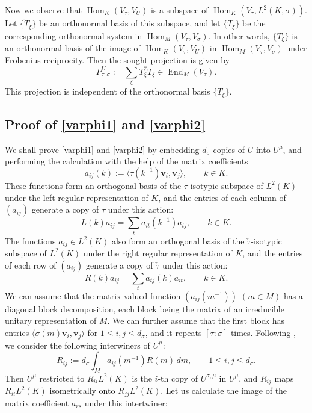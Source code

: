 \documentclass[11pt,oneside]{amsart}
\numberwithin{equation}{section}
\theoremstyle{remark}
\theoremstyle{plain}
\DeclareMathOperator{\Hom}{Hom}
\DeclareMathOperator{\End}{End}
\newcommand{\bv}{\mathbf{v}}
\renewcommand\leq{\leqslant}
\begin{document}
Now we observe that $\Hom_K(V_\tau,V_U)$ is a subspace of $\Hom_K(V_\tau,L^2(K,\sigma))$. Let $\{\widetilde T_\xi\}$ be an orthonormal basis of this subspace, and let $\{T_\xi\}$ be the corresponding orthonormal system in $\Hom_M(V_\tau,V_\sigma)$. In other words, $\{T_\xi\}$ is an orthonormal basis of the image of $\Hom_K(V_\tau,V_U)$ in $\Hom_M(V_\tau,V_\sigma)$ under Frobenius reciprocity. Then the sought projection is given by
\begin{equation}\label{varphi2}
P_{\tau,\sigma}^U:=\sum_\xi T_\xi^* T_\xi\in\End_M(V_\tau).
\end{equation}
This projection is independent of the orthonormal basis $\{T_\xi\}$.

\subsection{Proof of \eqref{varphi1} and \eqref{varphi2}}
We shall prove \eqref{varphi1} and \eqref{varphi2} by embedding $d_\sigma$ copies of $U$ into $U^\mu$, and performing the calculation with the help of the matrix coefficients
\[a_{ij}(k):=\langle\tau(k^{-1})\bv_i,\bv_j\rangle,\qquad k\in K.\]
These functions form an orthogonal basis of the $\tau$-isotypic subspace of $L^2(K)$ under the left regular representation of $K$, and the entries of each column of $(a_{ij})$ generate a copy of $\tau$ under this action:
\begin{equation*}
L(k)a_{ij}=\sum_t a_{it}(k^{-1})a_{tj},\qquad k\in K.
\end{equation*}
The functions $a_{ij}\in L^2(K)$ also form an orthogonal basis of the $\check\tau$-isotypic subspace of $L^2(K)$ under the right regular representation of $K$, and the entries of each row of $(a_{ij})$ generate a copy of $\check\tau$ under this action:
\begin{equation*}
R(k)a_{ij}=\sum_t a_{tj}(k)a_{it},\qquad k\in K.
\end{equation*}
We can assume that the matrix-valued function $(a_{ij}(m^{-1}))$ $(m\in M)$ has a diagonal block decomposition, each block being the matrix of an irreducible unitary representation of $M$. We can further assume that the first block has entries $\langle\sigma(m)\bv_i,\bv_j\rangle$ for $1\leq i,j\leq d_\sigma$, and it repeats $[\tau:\sigma]$ times. Following \cite[p.~447]{W1}, we consider the following interwiners of $U^\mu$:
\[R_{ij}:=d_\sigma\int_M a_{ij}(m^{-1})R(m)\,dm,\qquad 1\leq i,j\leq d_\sigma.\]
Then $U^\mu$ restricted to $R_{ii}L^2(K)$ is the $i$-th copy of $U^{\sigma,\mu}$ in $U^\mu$, and $R_{ij}$ maps $R_{ii}L^2(K)$ isometrically onto $R_{jj}L^2(K)$. Let us calculate the image of the matrix coefficient $a_{rs}$ under this intertwiner:
\end{document}
